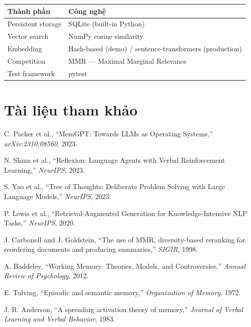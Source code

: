 \documentclass[a4paper,12pt]{article}
\begin{document}
\begin{table}[H]
\centering
\begin{tabular}{ll}
\toprule
\textbf{Thành phần} & \textbf{Công nghệ} \\
\midrule
Persistent storage & SQLite (built-in Python) \\
Vector search      & NumPy cosine similarity \\
Embedding          & Hash-based (demo) / sentence-transformers (production) \\
Competition        & MMR --- Maximal Marginal Relevance \\
Test framework     & pytest \\
\bottomrule
\end{tabular}
\end{table}

\section{Tài liệu tham khảo}

\begin{enumerate}[label={[\arabic*]}]
\item C. Packer et al., ``MemGPT: Towards LLMs as Operating Systems,'' \emph{arXiv:2310.08560}, 2023.
\item N. Shinn et al., ``Reflexion: Language Agents with Verbal Reinforcement Learning,'' \emph{NeurIPS}, 2023.
\item S. Yao et al., ``Tree of Thoughts: Deliberate Problem Solving with Large Language Models,'' \emph{NeurIPS}, 2023.
\item P. Lewis et al., ``Retrieval-Augmented Generation for Knowledge-Intensive NLP Tasks,'' \emph{NeurIPS}, 2020.
\item J. Carbonell and J. Goldstein, ``The use of MMR, diversity-based reranking for reordering documents and producing summaries,'' \emph{SIGIR}, 1998.
\item A. Baddeley, ``Working Memory: Theories, Models, and Controversies,'' \emph{Annual Review of Psychology}, 2012.
\item E. Tulving, ``Episodic and semantic memory,'' \emph{Organization of Memory}, 1972.
\item J. R. Anderson, ``A spreading activation theory of memory,'' \emph{Journal of Verbal Learning and Verbal Behavior}, 1983.
\end{enumerate}
\end{document}
